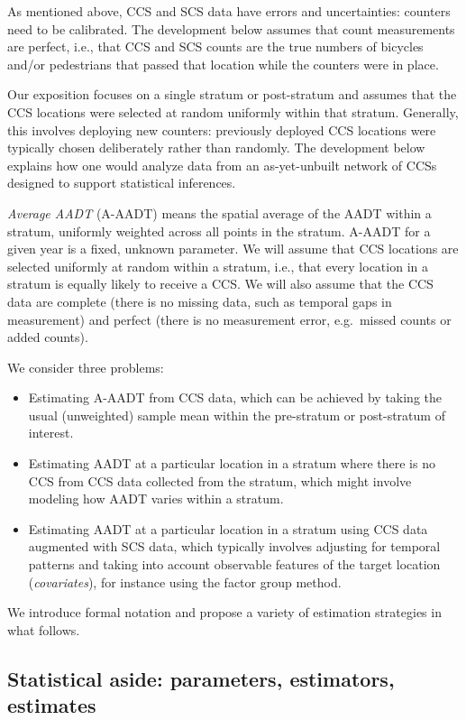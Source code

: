 \documentclass[11pt]{article}
\providecommand{\tightlist}{%
      \setlength{\itemsep}{0pt}\setlength{\parskip}{0pt}}
\begin{document}
As mentioned above, CCS and SCS data have errors and uncertainties:
counters need to be calibrated. The development below assumes that count
measurements are perfect, i.e., that CCS and SCS counts are the true
numbers of bicycles and/or pedestrians that passed that location while
the counters were in place.

Our exposition focuses on a single stratum or post-stratum and assumes
that the CCS locations were selected at random uniformly within that
stratum. Generally, this involves deploying new counters: previously
deployed CCS locations were typically chosen deliberately rather than
randomly. The development below explains how one would analyze data from
an as-yet-unbuilt network of CCSs designed to support statistical
inferences.

\emph{Average AADT} (A-AADT) means the spatial average of the AADT
within a stratum, uniformly weighted across all points in the stratum.
A-AADT for a given year is a fixed, unknown parameter. We will assume
that CCS locations are selected uniformly at random within a stratum,
i.e., that every location in a stratum is equally likely to receive a
CCS. We will also assume that the CCS data are complete (there is no
missing data, such as temporal gaps in measurement) and perfect (there
is no measurement error, e.g.~missed counts or added counts).

We consider three problems:

\begin{itemize}
\tightlist
\item
  Estimating A-AADT from CCS data, which can be achieved by taking the
  usual (unweighted) sample mean within the pre-stratum or post-stratum
  of interest.
\item
  Estimating AADT at a particular location in a stratum where there is
  no CCS from CCS data collected from the stratum, which might involve
  modeling how AADT varies within a stratum.
\item
  Estimating AADT at a particular location in a stratum using CCS data
  augmented with SCS data, which typically involves adjusting for
  temporal patterns and taking into account observable features of the
  target location (\emph{covariates}), for instance using the factor
  group method.
\end{itemize}

We introduce formal notation and propose a variety of estimation
strategies in what follows.

    \subsection{Statistical aside: parameters, estimators,
estimates}\label{statistical-aside-parameters-estimators-estimates}
\end{document}
